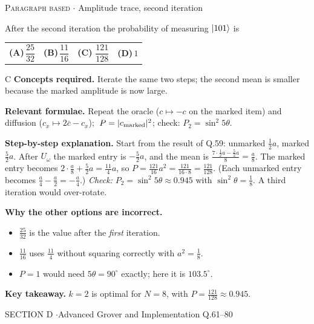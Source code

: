 \documentclass[11pt,a4paper]{article}
\newcommand{\optlabel}[1]{\textbf{(#1)}}
\newcommand{\correctlabel}[1]{\textcolor{okgreen}{\textbf{(#1)}\,\ding{51}}}
\newenvironment{qitem}[1]{\begin{list}{}{\setlength{\leftmargin}{3.3em}\setlength{\labelwidth}{3.1em}%
  \setlength{\labelsep}{0.2em}\setlength{\topsep}{3pt}\setlength{\parsep}{3pt}}\item[\textbf{Q.#1}\hfill]}{\end{list}}
\newcommand{\qsep}{\par\vspace{2pt}{\color{black!15}\hrule}\vspace{4pt}}
\newcommand{\qmeta}[2]{{\footnotesize\color{black!60}\textsc{#1} \;$\cdot$\; #2}\par}
\begin{document}
\begin{qitem}{60}
\qmeta{Paragraph based}{Amplitude trace, second iteration}
After the second iteration the probability of measuring $\ket{101}$ is
\par\smallskip\noindent\begin{tabularx}{\linewidth}{@{}*{4}{L}@{}}
\optlabel{A}\,$\dfrac{25}{32}$ & \optlabel{B}\,$\dfrac{11}{16}$ & \correctlabel{C}\,$\dfrac{121}{128}$ & \optlabel{D}\,$1$
\end{tabularx}
\end{qitem}
\begin{solbox}{C}
\textbf{\color{brand}Concepts required.} Iterate the same two steps; the second mean is smaller because the marked amplitude is now large.

\textbf{\color{brand}Relevant formulae.} Repeat the oracle ($c \mapsto -c$ on the marked item) and diffusion ($c_x \mapsto 2\bar c - c_x$); $\;P = |c_{\rm marked}|^2$; check: $P_2 = \sin^2 5\theta$.

\textbf{\color{brand}Step-by-step explanation.} Start from the result of Q.59: unmarked $\frac12a$, marked $\frac52a$. After $U_\omega$ the marked entry is $-\frac52a$, and the mean is $\frac{7\cdot\frac12a - \frac52a}{8} = \frac{a}{8}$.
The marked entry becomes $2\cdot\frac a8 + \frac52a = \frac{11}{4}a$, so $P = \frac{121}{16}a^2 = \frac{121}{16\cdot8} = \frac{121}{128}$. (Each unmarked entry becomes $\frac a4 - \frac a2 = -\frac a4$.)
\emph{Check:} $P_2 = \sin^2 5\theta \approx 0.945$ with $\sin^2\theta = \frac18$. A third iteration would over-rotate.

\textbf{\color{brand}Why the other options are incorrect.}
\begin{itemize}[leftmargin=2.4em, itemsep=1pt, topsep=2pt]
\item[\textbf{(A)}] $\frac{25}{32}$ is the value after the \emph{first} iteration.
\item[\textbf{(B)}] $\frac{11}{16}$ uses $\frac{11}{4}$ without squaring correctly with $a^2 = \frac18$.
\item[\textbf{(D)}] $P = 1$ would need $5\theta = 90^\circ$ exactly; here it is $103.5^\circ$.
\end{itemize}
\textbf{\color{brand}Key takeaway.} $k = 2$ is optimal for $N = 8$, with $P = \frac{121}{128} \approx 0.945$.
\end{solbox}
\qsep

\newpage

\begin{sectionbanner}SECTION D \enspace$\cdot$\enspace Advanced Grover and Implementation \hfill Q.61--80\end{sectionbanner}
\end{document}
